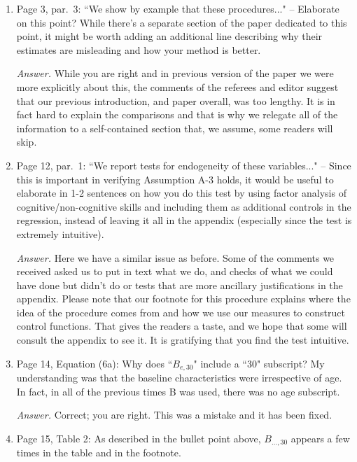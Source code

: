 \begin{enumerate}

\item Page 3, par.\ 3: ``We show by example that these procedures..." -- Elaborate on this point? While there's a separate section of the paper dedicated to this point, it might be worth adding an additional line describing why their estimates are misleading and how your method is better.

\noindent \textit{Answer.} While you are right and in previous version of the paper we were more explicitly about this, the comments of the referees and editor suggest that our previous introduction, and paper overall, was too lengthy. It is in fact hard to explain the comparisons and that is why we relegate all of the information to a self-contained section that, we assume, some readers will skip. 

\item Page 12, par.\ 1: ``We report tests for endogeneity of these variables..." -- Since this is important in verifying Assumption A-3 holds, it would be useful to elaborate in 1-2 sentences on how you do this test by using factor analysis of cognitive/non-cognitive skills and including them as additional controls in the regression, instead of leaving it all in the appendix (especially since the test is extremely intuitive). 

\noindent \textit{Answer.} Here we have a similar issue as before. Some of the comments we received asked us to put in text what we do, and checks of what we could have done but didn't do or tests that are more ancillary justifications in the appendix. Please note that our footnote for this procedure explains where the idea of the procedure comes from and how we use our measures to construct control functions. That gives the readers a taste, and we hope that some will consult the appendix to see it. It is gratifying that you find the test intuitive. 

\item Page 14, Equation (6a): Why does ``$B_{e,30}$" include a ``30" subscript? My understanding was that the baseline characteristics were irrespective of age. In fact, in all of the previous times B was used, there was no age subscript. 

\noindent \textit{Answer.} Correct; you are right. This was a mistake and it has been fixed.

\item Page 15, Table 2: As described in the bullet point above, $B_{...,30}$ appears a few times in the table and in the footnote.


\end{enumerate}
